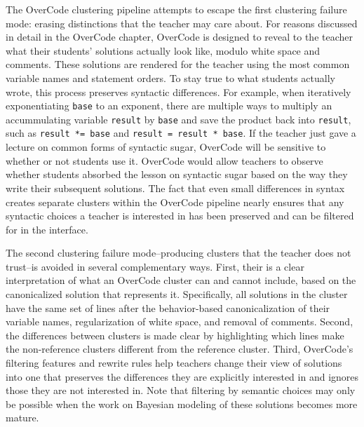 The OverCode clustering pipeline attempts to escape the first clustering failure mode: erasing distinctions that the teacher may care about. For reasons discussed in detail in the OverCode chapter, OverCode is designed to reveal to the teacher what their students' solutions actually look like, modulo white space and comments. These solutions are rendered for the teacher using the most common variable names and statement orders. To stay true to what students actually wrote, this process preserves syntactic differences. For example, when iteratively exponentiating \texttt{base} to an exponent, there are multiple ways to multiply an accummulating variable \texttt{result} by \texttt{base} and save the product back into \texttt{result}, such as \texttt{result *= base} and \texttt{result = result * base}. If the teacher just gave a lecture on common forms of syntactic sugar, OverCode will be sensitive to whether or not students use it. OverCode would allow teachers to observe whether students absorbed the lesson on syntactic sugar based on the way they write their subsequent solutions. The fact that even small differences in syntax creates separate clusters within the OverCode pipeline nearly ensures that any syntactic choices a teacher is interested in has been preserved and can be filtered for in the interface.



The second clustering failure mode--producing clusters that the teacher does not trust--is avoided in several complementary ways. First, their is a clear interpretation of what an OverCode cluster can and cannot include, based on the canonicalized solution that represents it. Specifically, all solutions in the cluster have the same set of lines after the behavior-based canonicalization of their variable names, regularization of white space, and removal of comments. Second, the differences between clusters is made clear by highlighting which lines make the non-reference clusters different from the reference cluster. Third, OverCode's filtering features and rewrite rules help teachers change their view of solutions into one that preserves the differences they are explicitly interested in and ignores those they are not interested in. Note that filtering by semantic choices may only be possible when the work on Bayesian modeling of these solutions becomes more mature. 


